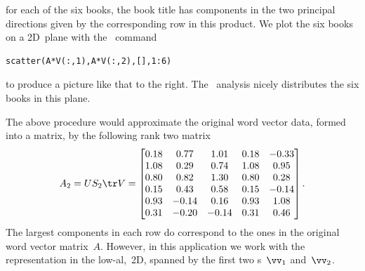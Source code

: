 \begin{enumerate}
\begin{figbox}{}%
for each of the six books, the book title has components in the two principal directions given by the corresponding row in this product.
We plot the six books on a 2D~plane with the \script\ command
\begin{verbatim}
scatter(A*V(:,1),A*V(:,2),[],1:6)
\end{verbatim}
to produce a picture like that to the right.
The \svd\ analysis nicely distributes the six books in this plane.

\end{figbox}
\end{enumerate}

The above procedure would approximate the original word vector data, formed into a matrix, by the following rank two matrix \twodp
\begin{equation*}
A_2=US_2\tr V
=\begin{bmatrix} 0.18&0.77&1.01&0.18&-0.33
\\1.08&0.29&0.74&1.08&0.95
\\0.80&0.82&1.30&0.80&0.28
\\0.15&0.43&0.58&0.15&-0.14
\\0.93&-0.14&0.16&0.93&1.08
\\0.31&-0.20&-0.14&0.31&0.46 \end{bmatrix}.
\end{equation*}
The largest components in each row do correspond to the ones in the original word vector matrix~\(A\).
However, in this application we work with the representation in the low-al,~2D,  spanned by the first two s~\(\vv_1\) and~\(\vv_2\).



